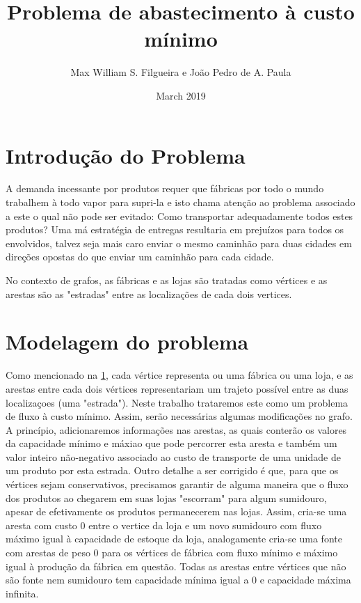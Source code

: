 \documentclass[12pt, a4]{article}
\title{Problema de abastecimento à custo mínimo}
\author{Max William S. Filgueira e João Pedro de A. Paula}
\date{March 2019}
\begin{document}
\maketitle

\tableofcontents

\newpage

\section{Introdução do Problema}
\label{sec:intro}

A demanda incessante por produtos requer que fábricas por todo o mundo trabalhem
à todo vapor para supri-la e isto chama atenção ao problema associado a este o
qual não pode ser evitado: Como transportar adequadamente todos estes produtos?
Uma má estratégia de entregas resultaria em prejuízos para todos os envolvidos,
talvez seja mais caro enviar o mesmo caminhão para duas cidades em direções
opostas do que enviar um caminhão para cada cidade.

No contexto de grafos, as fábricas e as lojas são tratadas como vértices e as
arestas são as "estradas" entre as localizações de cada dois vertices.

\section{Modelagem do problema}
\label{sec:modelling}

Como mencionado na \ref{sec:intro}, cada vértice representa ou uma fábrica ou uma
loja, e as arestas entre cada dois vértices representariam um trajeto possível
entre as duas localizaçoes (uma "estrada"). Neste trabalho trataremos este como
um problema de fluxo à custo mínimo. Assim, serão necessárias algumas
modificações no grafo. A princípio, adicionaremos informações nas arestas, as
quais conterão os valores da capacidade mínimo e máxiao que pode percorrer esta
aresta e também um valor inteiro não-negativo associado ao custo de transporte
de uma unidade de um produto por esta estrada. Outro detalhe a ser corrigido é
que, para que os vértices sejam conservativos, precisamos garantir de alguma
maneira que o fluxo dos produtos ao chegarem em suas lojas "escorram" para algum
sumidouro, apesar de efetivamente os produtos permanecerem nas lojas. Assim,
cria-se uma aresta com custo 0 entre o vertice da loja e um novo sumidouro com
fluxo máximo igual à capacidade de estoque da loja, analogamente cria-se uma
fonte com arestas de peso 0 para os vértices de fábrica com fluxo mínimo e
máximo igual à produção da fábrica em questão. Todas as arestas entre vértices
que não são fonte nem sumidouro tem capacidade mínima igual a 0 e capacidade
máxima infinita.
\end{document}

